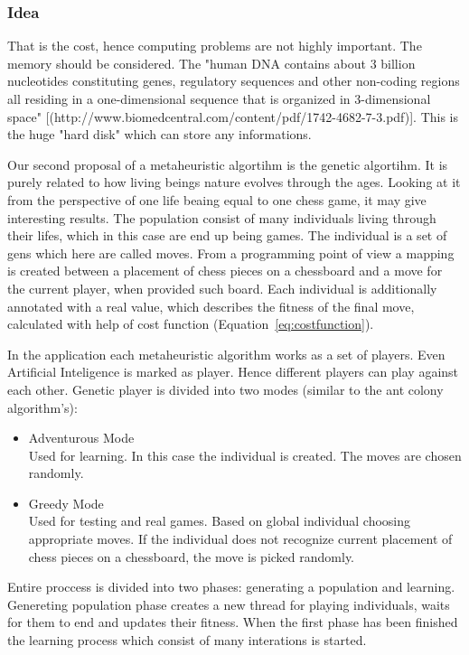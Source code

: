 \documentclass[pdftex]{article}
\begin{document}
\subsubsection{Idea}
That is the cost, hence computing problems are not highly important. The memory should be considered. The "human DNA contains about 3 billion nucleotides constituting genes, regulatory sequences and other non-coding regions all residing in a one-dimensional sequence that is organized in 3-dimensional space" [(http://www.biomedcentral.com/content/pdf/1742-4682-7-3.pdf)]. This is the huge "hard disk" which can store any informations.


Our second proposal of a metaheuristic algortihm is the genetic algortihm. It is purely related to how living beings nature evolves through the ages. Looking at it from the perspective of one life beaing equal to one chess game, it may give interesting results. The population consist of many individuals living through their lifes, which in this case are end up being games. The individual is a set of gens which here are called moves. From a programming point of view a mapping is created between a placement of chess pieces on a chessboard and a move for the current player, when provided such board. Each individual is additionally annotated with a real value, which describes the fitness of the final move, calculated with help of cost function (Equation~\ref{eq:costfunction}).

In the application each metaheuristic algorithm works as a set of players. Even Artificial Inteligence is marked as player. Hence different players can play against each other. Genetic player is divided into two modes (similar to the ant colony algorithm's):
\begin{itemize}
 	\item Adventurous Mode \hfill \\
		Used for learning. In this case the individual is created. The moves are chosen randomly.

	\item Greedy Mode \hfill \\
		Used for testing and real games. Based on global individual choosing appropriate moves. If the individual does not recognize current placement of chess pieces on a chessboard, the move is picked randomly.
\end{itemize}

Entire proccess is divided into two phases: generating a population and learning.
Genereting population phase creates a new thread for playing individuals, waits for them to end and updates their fitness.
When the first phase has been finished the learning process which consist of many interations is started.
\end{document}
